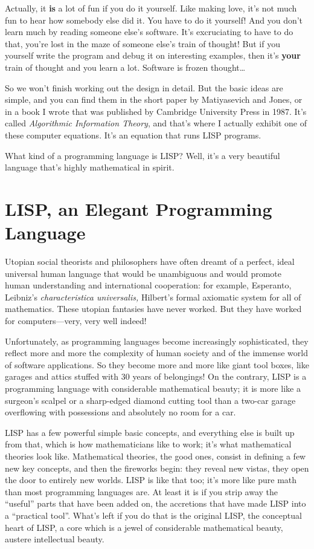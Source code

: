 \documentclass[12pt]{book}
\begin{document}
Actually, it \textbf{is} a lot of fun if you do it yourself. 
Like making love,
it's not much fun to hear how somebody else did it.
You have to do it yourself!
And you don't learn much by reading someone else's software. It's excruciating to have to do that,
you're lost in the maze of someone else's train of thought!
But if you yourself write the program and debug it on interesting examples, 
then it's \textbf{your} train of thought and you learn a lot.
Software is frozen thought\ldots
 
So we won't finish working out the design in detail.
But the basic ideas are simple, and you can find them in the short
paper by Matiyasevich and Jones, or 
in a book
I wrote that was published by Cambridge University Press in 1987. It's called \emph{Algorithmic
Information Theory}, and that's where I actually exhibit one of these computer equations.  
It's an equation that runs LISP programs.
 
What kind of a programming language is LISP?
Well, it's a very beautiful language that's highly mathematical in spirit.

\section*{LISP, an Elegant Programming Language}

Utopian social theorists and philosophers have often dreamt of a perfect, ideal
universal human language that would be unambiguous and would promote human understanding
and international cooperation: for example, Esperanto, Leibniz's
\emph{characteristica universalis,} Hilbert's formal axiomatic system for all of mathematics.
These utopian fantasies have never worked.
But they have worked for computers---very, very well indeed!
 
Unfortunately,
as programming languages become increasingly sophisticated, they reflect more and
more the complexity of human society and of the immense world of software applications. 
So they become more and more like giant
tool boxes, like garages and attics stuffed with 30 years of belongings!
On the contrary, LISP is a programming language with considerable
mathematical beauty; it is more like a surgeon's scalpel or a sharp-edged diamond cutting tool
than a two-car garage overflowing with possessions and absolutely no room for a car.  
 
LISP has a few powerful simple basic concepts,
and everything else is built up from that, which is how mathematicians like
to work; it's what mathematical theories look like.
Mathematical theories, the good ones, consist in defining a few new 
key 
concepts,
and then the fireworks begin: they reveal new vistas, they open the door
to entirely new worlds. LISP is like that too; it's more like pure math than most
programming languages are.  At least it is if you strip away the ``useful''
parts that have been added on, the accretions that have made
LISP into a ``practical tool''.   What's left if you do that is the original LISP,
the conceptual heart of LISP, a core which is a jewel of considerable mathematical
beauty, austere intellectual beauty. 
 
\end{document}

